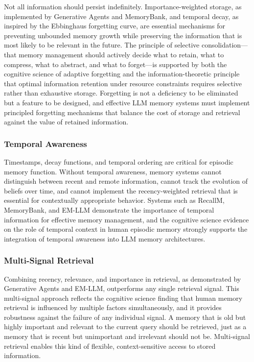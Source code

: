 \documentclass[11pt,letterpaper]{article}
\begin{document}
Not all information should persist indefinitely. Importance-weighted storage, as implemented by Generative Agents and MemoryBank, and temporal decay, as inspired by the Ebbinghaus forgetting curve, are essential mechanisms for preventing unbounded memory growth while preserving the information that is most likely to be relevant in the future. The principle of selective consolidation---that memory management should actively decide what to retain, what to compress, what to abstract, and what to forget---is supported by both the cognitive science of adaptive forgetting and the information-theoretic principle that optimal information retention under resource constraints requires selective rather than exhaustive storage. Forgetting is not a deficiency to be eliminated but a feature to be designed, and effective LLM memory systems must implement principled forgetting mechanisms that balance the cost of storage and retrieval against the value of retained information.

\subsubsection{Temporal Awareness}

Timestamps, decay functions, and temporal ordering are critical for episodic memory function. Without temporal awareness, memory systems cannot distinguish between recent and remote information, cannot track the evolution of beliefs over time, and cannot implement the recency-weighted retrieval that is essential for contextually appropriate behavior. Systems such as RecallM, MemoryBank, and EM-LLM demonstrate the importance of temporal information for effective memory management, and the cognitive science evidence on the role of temporal context in human episodic memory strongly supports the integration of temporal awareness into LLM memory architectures.

\subsubsection{Multi-Signal Retrieval}

Combining recency, relevance, and importance in retrieval, as demonstrated by Generative Agents and EM-LLM, outperforms any single retrieval signal. This multi-signal approach reflects the cognitive science finding that human memory retrieval is influenced by multiple factors simultaneously, and it provides robustness against the failure of any individual signal. A memory that is old but highly important and relevant to the current query should be retrieved, just as a memory that is recent but unimportant and irrelevant should not be. Multi-signal retrieval enables this kind of flexible, context-sensitive access to stored information.
\end{document}
